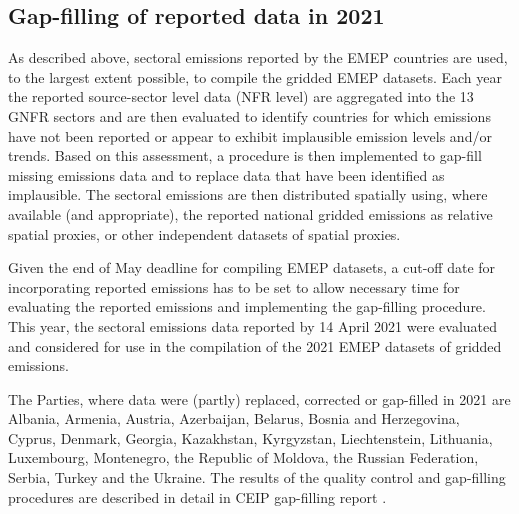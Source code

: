 \subsection{Gap-filling of reported data in 2021}
\label{sec:gapfilling}

As described above, sectoral emissions reported by the EMEP countries are used, to the largest extent possible, to compile the gridded EMEP datasets. Each year the reported source-sector level data (NFR level) are aggregated into the 13 GNFR sectors and are then evaluated to identify countries for which emissions have not been reported or appear to exhibit implausible emission levels and/or trends. Based on this assessment, a procedure is then implemented to gap-fill missing emissions data and to replace data that have been identified as implausible. The sectoral emissions are then distributed spatially using, where available (and appropriate), the reported national gridded emissions as relative spatial proxies, or other independent datasets of spatial proxies.

Given the end of May deadline for compiling EMEP datasets, a cut-off date for incorporating reported emissions has to be set to allow necessary time for evaluating the reported emissions and implementing the gap-filling procedure. This year, the sectoral emissions data reported by 14 April 2021 were evaluated and considered for use in the compilation of the 2021 EMEP datasets of gridded emissions.

The Parties, where data were (partly) replaced, corrected or gap-filled in 2021 are Albania, Armenia, Austria, Azerbaijan, Belarus, Bosnia and Herzegovina, Cyprus, Denmark, Georgia, Kazakhstan, Kyrgyzstan, Liechtenstein, Lithuania, Luxembourg,  Montenegro, the Republic of Moldova, the Russian Federation, Serbia, Turkey and the Ukraine. The results of the quality control and gap-filling procedures are described in detail in CEIP gap-filling report \citep{CEIP2021c}. %


